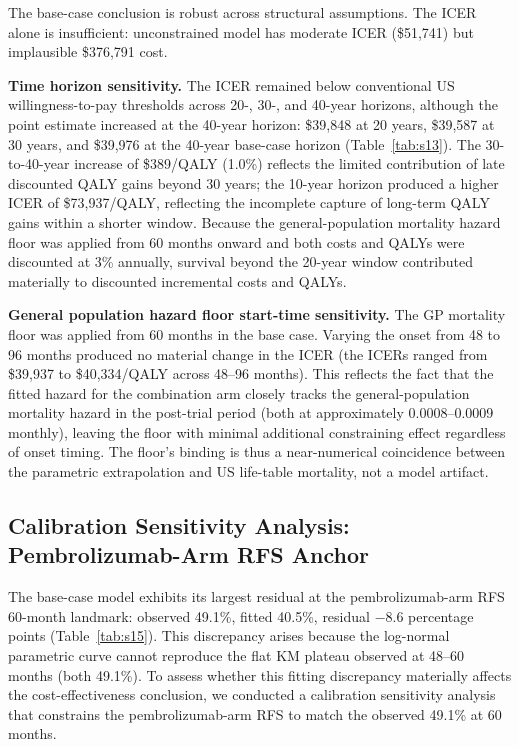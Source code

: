 \documentclass[11pt,a4paper]{article}
\begin{document}
\noindent The base-case conclusion is robust across structural assumptions. The ICER alone is insufficient: unconstrained model has moderate ICER (\$51,741) but implausible \$376,791 cost.

\indent \textbf{Time horizon sensitivity.} The ICER remained below conventional US willingness-to-pay thresholds across 20-, 30-, and 40-year horizons, although the point estimate increased at the 40-year horizon: \$39,848 at 20 years, \$39,587 at 30 years, and \$39,976 at the 40-year base-case horizon (Table~\ref{tab:s13}). The 30-to-40-year increase of \$389/QALY (1.0\%) reflects the limited contribution of late discounted QALY gains beyond 30 years; the 10-year horizon produced a higher ICER of \$73,937/QALY, reflecting the incomplete capture of long-term QALY gains within a shorter window. Because the general-population mortality hazard floor was applied from 60 months onward and both costs and QALYs were discounted at 3\% annually, survival beyond the 20-year window contributed materially to discounted incremental costs and QALYs.

\noindent \textbf{General population hazard floor start-time sensitivity.} The GP mortality floor was applied from 60 months in the base case. Varying the onset from 48 to 96 months produced no material change in the ICER (the ICERs ranged from \$39,937 to \$40,334/QALY across 48--96 months). This reflects the fact that the fitted hazard for the combination arm closely tracks the general-population mortality hazard in the post-trial period (both at approximately 0.0008--0.0009 monthly), leaving the floor with minimal additional constraining effect regardless of onset timing. The floor's binding is thus a near-numerical coincidence between the parametric extrapolation and US life-table mortality, not a model artifact.

\subsection{Calibration Sensitivity Analysis: Pembrolizumab-Arm RFS Anchor}
\label{sec:rfs_anchor}

The base-case model exhibits its largest residual at the pembrolizumab-arm RFS 60-month landmark: observed 49.1\%, fitted 40.5\%, residual $-8.6$ percentage points (Table~\ref{tab:s15}). This discrepancy arises because the log-normal parametric curve cannot reproduce the flat KM plateau observed at 48--60 months (both 49.1\%). To assess whether this fitting discrepancy materially affects the cost-effectiveness conclusion, we conducted a calibration sensitivity analysis that constrains the pembrolizumab-arm RFS to match the observed 49.1\% at 60 months.
\end{document}
